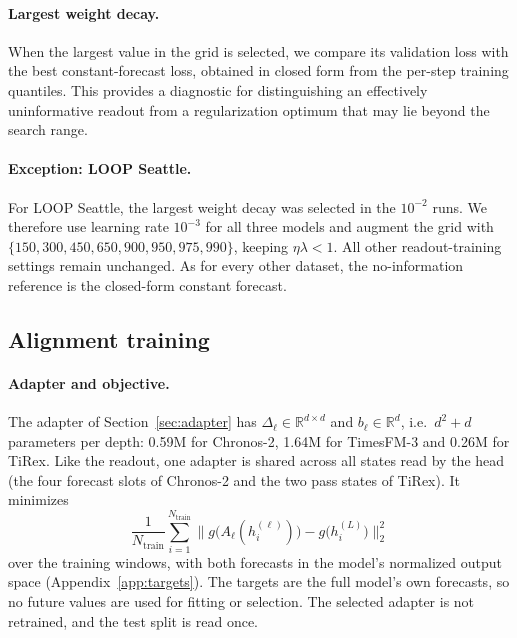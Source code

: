 \documentclass{article} %
\begin{document}
\paragraph{Largest weight decay.}
When the largest value in the grid is selected, we compare its validation loss with the best
constant-forecast loss, obtained in closed form from the per-step training quantiles. This
provides a diagnostic for distinguishing an effectively uninformative readout from a
regularization optimum that may lie beyond the search range.

\paragraph{Exception: LOOP Seattle.}
For LOOP Seattle, the largest weight decay was selected in the $10^{-2}$ runs. We therefore
use learning rate $10^{-3}$ for all three models and augment the grid with
$\{150,300,450,650,900,950,975,990\}$, keeping $\eta\lambda<1$. All other readout-training
settings remain unchanged. As for every other dataset, the no-information reference is the
closed-form constant forecast.

\subsection{Alignment training}
\label{app:alignment}

\paragraph{Adapter and objective.} The adapter of Section~\ref{sec:adapter} has
$\Delta_\ell\in\mathbb{R}^{d\times d}$ and $b_\ell\in\mathbb{R}^{d}$, i.e.\ $d^2+d$ parameters per
depth: 0.59M for Chronos-2, 1.64M for TimesFM-3 and 0.26M for TiRex. Like the readout, one adapter
is shared across all states read by the head (the four forecast slots of Chronos-2 and the two pass
states of TiRex). It minimizes
\begin{equation}
\frac{1}{N_{\mathrm{train}}}\sum_{i=1}^{N_{\mathrm{train}}}
\bigl\| g\bigl(A_\ell(h_i^{(\ell)})\bigr) - g\bigl(h_i^{(L)}\bigr) \bigr\|_2^2
\label{eq:adapter_objective}
\end{equation}
over the training windows, with both forecasts in the model's normalized output space
(Appendix~\ref{app:targets}). The targets are the full model's own forecasts, so no future values
are used for fitting or selection. The selected adapter is not retrained, and the test split is read
once.
\end{document}

